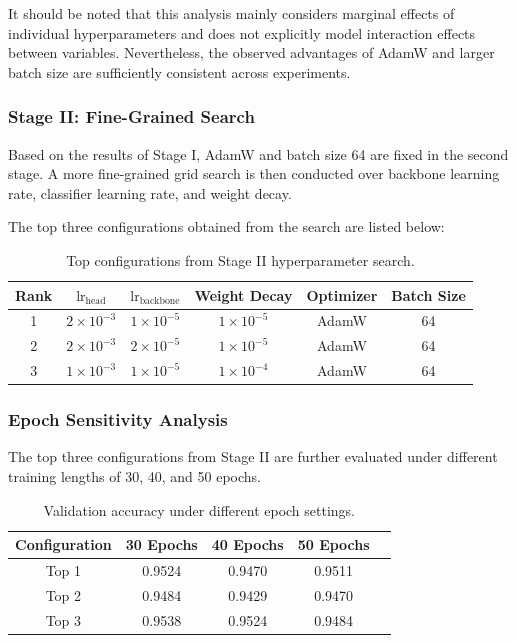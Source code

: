It should be noted that this analysis mainly considers marginal effects of individual hyperparameters and does not explicitly model interaction effects between variables. Nevertheless, the observed advantages of AdamW and larger batch size are sufficiently consistent across experiments.

\subsubsection{Stage II: Fine-Grained Search}

Based on the results of Stage I, AdamW and batch size 64 are fixed in the second stage. A more fine-grained grid search is then conducted over backbone learning rate, classifier learning rate, and weight decay.

The top three configurations obtained from the search are listed below:

\begin{table}[H]
\centering
\caption{Top configurations from Stage II hyperparameter search.}
\label{tab:stage2_top3}
\begin{tabular}{cccccc}
\toprule
Rank & $\text{lr}_{\text{head}}$ & $\text{lr}_{\text{backbone}}$ & Weight Decay & Optimizer & Batch Size \\
\midrule
1 & $2 \times 10^{-3}$ & $1 \times 10^{-5}$ & $1 \times 10^{-5}$ & AdamW & 64 \\
2 & $2 \times 10^{-3}$ & $2 \times 10^{-5}$ & $1 \times 10^{-5}$ & AdamW & 64 \\
3 & $1 \times 10^{-3}$ & $1 \times 10^{-5}$ & $1 \times 10^{-4}$ & AdamW & 64 \\
\bottomrule
\end{tabular}
\end{table}

\subsubsection{Epoch Sensitivity Analysis}

The top three configurations from Stage II are further evaluated under different training lengths of 30, 40, and 50 epochs.

\begin{table}[H]
\centering
\caption{Validation accuracy under different epoch settings.}
\label{tab:epoch_analysis}
\begin{tabular}{ccccc}
\toprule
Configuration & 30 Epochs & 40 Epochs & 50 Epochs \\
\midrule
Top 1 & 0.9524 & 0.9470 & 0.9511 \\
Top 2 & 0.9484 & 0.9429 & 0.9470 \\
Top 3 & 0.9538 & 0.9524 & 0.9484 \\
\bottomrule
\end{tabular}
\end{table}

